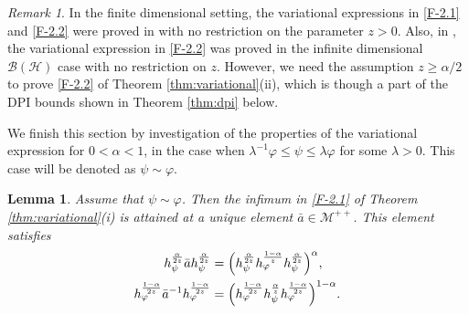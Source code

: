 \documentclass[12pt]{article}
\newtheorem{lemma}[theorem]{Lemma}
\theoremstyle{definition}
\theoremstyle{remark}
\newtheorem{remark}[theorem]{Remark}
\numberwithin{equation}{section}
\def\Me{\mathcal M}
\def\ffi{\varphi}
\begin{document}
\begin{remark}\label{remark:variational}
In the finite dimensional setting, the variational expressions in \eqref{F-2.1} and \eqref{F-2.2} were proved
in \cite[Theorem 3.3]{zhang2020fromwyd} with no restriction on the parameter $z>0$. Also, in
\cite[Lemma 3.23]{mosonyi2023thestrong}, the variational expression in \eqref{F-2.2} was proved in the
infinite dimensional $\mathcal{B}(\mathcal{H})$ case with no restriction on $z$.
{\color{red}However, we need the assumption $z\ge\alpha/2$ to prove \eqref{F-2.2} of
Theorem \ref{thm:variational}(ii), which is though a part of the DPI bounds shown in
Theorem \ref{thm:dpi} below.}
\end{remark}

\medskip
We finish this section by investigation of the properties of the variational expression for
$0<\alpha<1$, in the case when $\lambda^{-1}\ffi\le \psi\le \lambda \ffi$ for some
$\lambda>0$. This case will be denoted as $\psi\sim \ffi$. 

\begin{lemma}\label{lemma:variational_majorized}
Assume that $\psi\sim\ffi$. Then the infimum in \eqref{F-2.1} of Theorem \ref{thm:variational}(i) is
attained at a unique element $\bar a\in \Me^{++}$. This element satisfies
\begin{align}
h_\psi^{\alpha\over2z}\bar ah_\psi^{\alpha\over2z}
&=\Bigl(h_\psi^{\alpha\over2z}h_\ffi^{1-\alpha\over z}h_\psi^{\alpha\over2z}\Bigr)^\alpha,
\label{eq:minimizer1}\\
h_\ffi^{1-\alpha\over2z}\bar a^{-1}h_\ffi^{1-\alpha\over2z}
&=\Bigl(h_\ffi^{1-\alpha\over2z}h_\psi^{\alpha\over
z}h_\ffi^{1-\alpha\over2z}\Bigr)^{1-\alpha}.
\label{eq:minimizer2}
\end{align}
\end{lemma}
\end{document}
